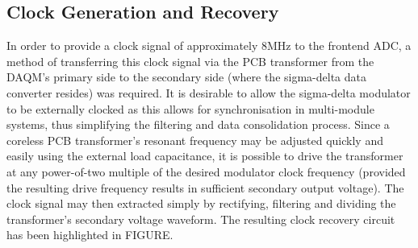 \documentclass[conference]{IEEEtran}
\begin{document}
	\subsection{Clock Generation and Recovery} %
	In order to provide a clock signal of approximately 8MHz to the frontend ADC, a method of transferring this clock signal via the PCB transformer from the DAQM's primary side to the secondary side (where the sigma-delta data converter resides) was required.  It is desirable to allow the sigma-delta modulator to be externally clocked as this allows for synchronisation in multi-module systems, thus simplifying the filtering and data consolidation process.  Since a coreless PCB transformer's resonant frequency may be adjusted quickly and easily using the external load capacitance, it is possible to drive the transformer at any power-of-two multiple of the desired modulator clock frequency (provided the resulting drive frequency results in sufficient secondary output voltage).  The clock signal may then extracted simply by rectifying, filtering and dividing the transformer's secondary voltage waveform.  The resulting clock recovery circuit has been highlighted in FIGURE.
	
\end{document}
